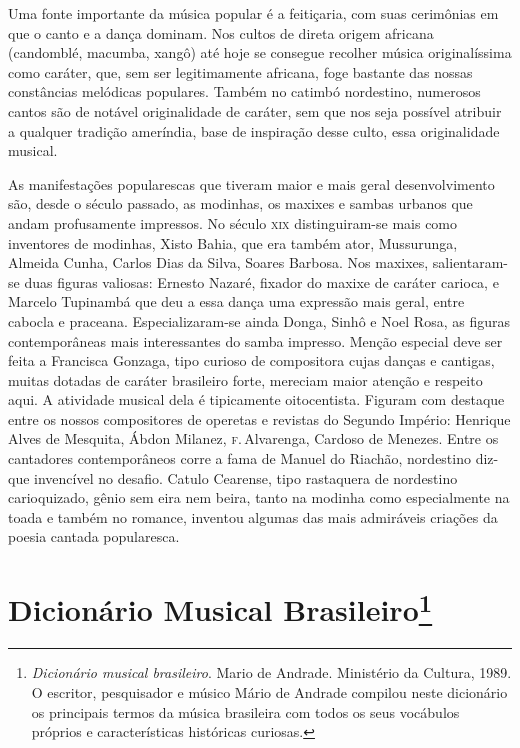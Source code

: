Uma fonte importante da música popular é a feitiçaria, com suas
cerimônias em que o canto e a dança dominam. Nos cultos de direta origem
africana (candomblé, macumba, xangô) até hoje se consegue recolher
música originalíssima como caráter, que, sem ser legitimamente africana,
foge bastante das nossas constâncias melódicas populares. Também no
catimbó nordestino, numerosos cantos são de notável originalidade de
caráter, sem que nos seja possível atribuir a qualquer tradição
ameríndia, base de inspiração desse culto, essa originalidade musical.

As manifestações popularescas que tiveram maior e mais geral
desenvolvimento são, desde o século passado, as modinhas, os maxixes e
sambas urbanos que andam profusamente impressos. No século \textsc{xix}
distinguiram-se mais como inventores de modinhas, Xisto Bahia, que era
também ator, Mussurunga, Almeida Cunha, Carlos Dias da Silva, Soares
Barbosa. Nos maxixes, salientaram-se duas figuras valiosas: Ernesto
Nazaré, fixador do maxixe de caráter carioca, e Marcelo Tupinambá que
deu a essa dança uma expressão mais geral, entre cabocla e praceana.
Especializaram-se ainda Donga, Sinhô e Noel Rosa, as figuras
contemporâneas mais interessantes do samba impresso. Menção especial
deve ser feita a Francisca Gonzaga, tipo curioso de compositora cujas
danças e cantigas, muitas dotadas de caráter brasileiro forte, mereciam
maior atenção e respeito aqui. A atividade musical dela é tipicamente
oitocentista. Figuram com destaque entre os nossos compositores de
operetas e revistas do Segundo Império: Henrique Alves de Mesquita,
Ábdon Milanez, \textsc{f}.\,Alvarenga, Cardoso de Menezes. Entre os cantadores
contemporâneos corre a fama de Manuel do Riachão, nordestino diz-que
invencível no desafio. Catulo Cearense, tipo rastaquera de nordestino
carioquizado, gênio sem eira nem beira, tanto na modinha como
especialmente na toada e também no romance, inventou algumas das mais
admiráveis criações da poesia cantada popularesca.



\chapter{Dicionário Musical Brasileiro\footnote{\emph{Dicionário musical brasileiro}. Mario de Andrade. Ministério da Cultura, 1989. O escritor, pesquisador e músico Mário de Andrade compilou neste dicionário os principais termos da música brasileira com todos os seus vocábulos próprios e características históricas curiosas.}}

